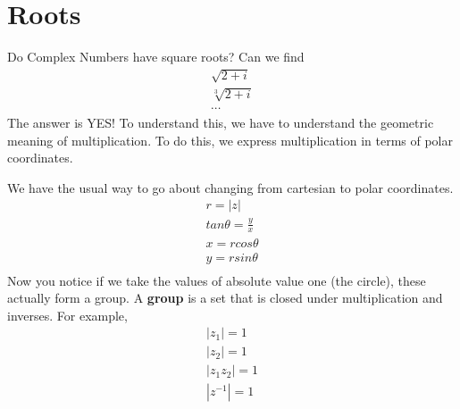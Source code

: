 \documentclass{article}
\begin{document}
\section{Roots}
Do Complex Numbers have square roots?
Can we find
\begin{gather*}
	\sqrt{2+i} \\
	\sqrt[3]{2+i} \\
	\cdots
\end{gather*}
The answer is YES! To understand this, we have to understand the geometric meaning of multiplication.
To do this, we express multiplication in terms of polar coordinates.

\begin{center}
\end{center}
We have the usual way to go about changing from cartesian to
polar coordinates.
\begin{gather*}
	r = |z| \\
	tan\theta = \frac{y}{x}\\
	x = rcos\theta \\
	y = rsin\theta \\
\end{gather*}
Now you notice if we take the values of absolute value one (the circle),
these actually form a group. A \textbf{group} is a set that is closed under
multiplication and inverses. For example,
\begin{gather*}
	|z_1| = 1 \\
	|z_2| = 1 \\
	|z_1 z_2| = 1 \\
	|z^{-1}| = 1 \\
\end{gather*}
\end{document}
